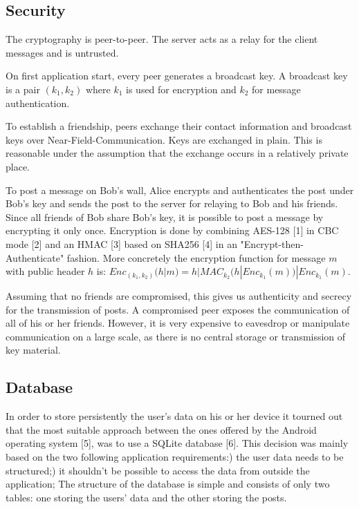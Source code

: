 \documentclass{report}
\begin{document}
\subsection{Security}
The cryptography is peer-to-peer. The server acts as a relay for the client messages and is untrusted.

On first application start, every peer generates a broadcast key. A broadcast key is a pair $(k_1, k_2)$ where $k_1$ is used for encryption and $k_2$ for message authentication.

To establish a friendship, peers exchange their contact information and broadcast keys over Near-Field-Communication. Keys are exchanged in plain. This is reasonable under the assumption that the exchange occurs in a relatively private place.

To post a message on Bob's wall, Alice encrypts and authenticates the post under Bob's key and sends the post to the server for relaying to Bob and his friends. Since all friends of Bob share Bob's key, it is possible to post a message by encrypting it only once. Encryption is done by combining AES-128 [1] in CBC mode [2] and an HMAC [3] based on SHA256 [4] in an "Encrypt-then-Authenticate" fashion. More concretely the encryption function for message $m$ with public header $h$ is: \newline
$Enc_{(k_1, k_2)}(h|m) = h | MAC_{k_2}(h | Enc_{k_1}(m)) | Enc_{k_1}(m)$.


Assuming that no friends are compromised, this gives us authenticity and secrecy for the transmission of posts. A compromised peer exposes the communication of all of his or her friends. However, it is very expensive to eavesdrop or manipulate communication on a large scale, as there is no central storage or transmission of key material.

\subsection{Database}
In order to store persistently the user's data on his or her device it tourned out that the most suitable approach between the ones offered by the Android operating system [5], was to use a SQLite database [6]. This decision was mainly based on the two following application requirements:) the user data needs to be structured;) it shouldn't be possible to access the data from outside the application;\newline
The structure of the database is simple and consists of only two tables: one storing the users' data and the other storing the posts.
\end{document}
